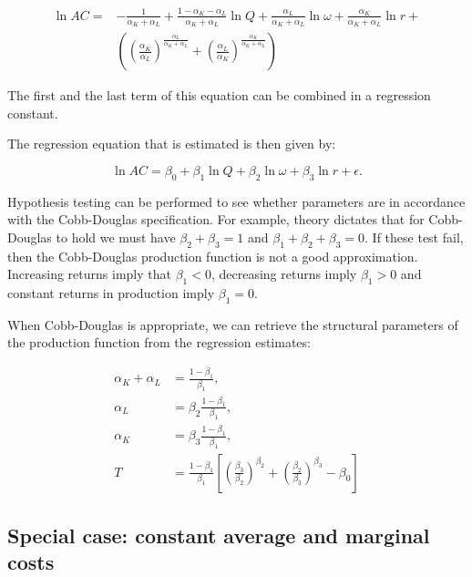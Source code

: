 \documentclass[
]{book}
\begin{document}
\begin{align}
\ln AC =& -\frac{1}{\alpha_K + \alpha_L} + \frac{1 - \alpha_K - \alpha_L}{\alpha_K + \alpha_L} \ln Q + \frac{\alpha_L}{\alpha_K + \alpha_L }\ln \omega +  \frac{\alpha_K}{\alpha_K + \alpha_L} \ln r + \\
&\left( \left( \frac{\alpha_K}{\alpha_L} \right)^{\frac{\alpha_L}{\alpha_K + \alpha_L}} + \left(\frac{\alpha_L}{\alpha_K} \right)^\frac{\alpha_K}{\alpha_K + \alpha_L} \right)
\end{align}

The first and the last term of this equation can be combined in a regression constant.

The regression equation that is estimated is then given by:

\begin{equation}
\ln AC = \beta_0 + \beta_1 \ln Q + \beta_2 \ln \omega + \beta_3 \ln r + \epsilon.
\end{equation}

Hypothesis testing can be performed to see whether parameters are in accordance with the Cobb-Douglas specification. For example, theory dictates that for Cobb-Douglas to hold we must have \(\beta_2 + \beta_3 = 1\) and \(\beta_1 + \beta_2 + \beta_3 = 0\). If these test fail, then the Cobb-Douglas production function is not a good approximation. Increasing returns imply that \(\beta_1<0\), decreasing returns imply \(\beta_1 >0\) and constant returns in production imply \(\beta_1 = 0\).

When Cobb-Douglas is appropriate, we can retrieve the structural parameters of the production function from the regression estimates:

\begin{align}
\alpha_K +\alpha_L &= \frac{1 - \beta_1}{\beta_1},\\
\alpha_L &= \beta_2 \frac{1 - \beta_1}{\beta_1},\\
\alpha_K &= \beta_3 \frac{1 - \beta_1}{\beta_1},\\
T &= \frac{1 - \beta_1}{\beta_1}\left[\left(\frac{\beta_3}{\beta_2} \right)^{\beta_2} +\left(\frac{\beta_2}{\beta_3} \right)^{\beta_3} - \beta_0\right]
\end{align}

\hypertarget{special-case-constant-average-and-marginal-costs}{%
\subsection{Special case: constant average and marginal costs}\label{special-case-constant-average-and-marginal-costs}}
\end{document}
